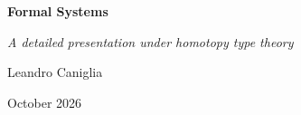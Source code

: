 \documentclass[openany]{book}
\author{Leandro Caniglia}
\date{October 2026}
\begin{document}
\begin{titlepage}
    \centering
    \vfill %
    
    {\fontsize{33}{40}\selectfont \bfseries Formal Systems\par}
    \vspace{0.6cm}
    
    {\fontsize{19}{24}\selectfont \slshape A detailed presentation under homotopy type theory\par}
    \vspace{2.5cm}
    
    {\Large Leandro Caniglia\par}
    \vspace{0.3cm}
    
    {\large October 2026\par}
    
    \vfill %
\end{titlepage}
\let\cleardoublepage\clearpage
\frontmatter
{}
{}
\tableofcontents
\mainmatter
\setlength{\parindent}{0pt}



\backmatter


\end{document}
